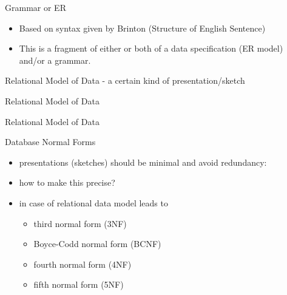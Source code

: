 \documentclass[xcolor=pst,dvips]{beamer}   %
\renewcommand{\erpictureFolder}[0]{../SharedPictures}
\begin{document}
\begin{frame}{Grammar or ER}
\begin{itemize}
\pause \item Based on syntax given by Brinton (Structure of English Sentence)
\end{itemize}
\begin{center}
\scalebox{0.85}{

}
\end{center}
\begin{itemize}
\pause \item This is a fragment of either or both of a data specification (ER model) and/or a grammar.
\end{itemize}
\end{frame}

\iffalse
\begin{frame}{Chicken and Egg}
The next ER diagram:
\begin{center}
\scalebox{0.9}{

}
\end{center}
\begin{center}
\begin{enumerate}
\item Has faults as a data specification.
\item Is still not a database specification. 
\end{enumerate}
\end{center}
\end{frame}
\fi

\begin{frame}{Relational Model of Data - a certain kind of presentation/sketch}

\end{frame}


\begin{frame}{Relational Model of Data}
\scalebox{0.6}{

}
\end{frame}

\begin{frame}{Relational Model of Data}
\scalebox{0.6}{

}
\end{frame}

\begin{frame}{Database Normal Forms}
\begin{itemize}
\item presentations (sketches) should be minimal and avoid redundancy:
\item how to make this precise?
\item in case of relational data model leads to 
   \begin{itemize}
     \item third normal form (3NF)
     \item Boyce-Codd normal form (BCNF)
     \item fourth normal form (4NF)
     \item fifth normal form (5NF)
   \end{itemize}
\end{itemize}
\end{frame}
\end{document}
